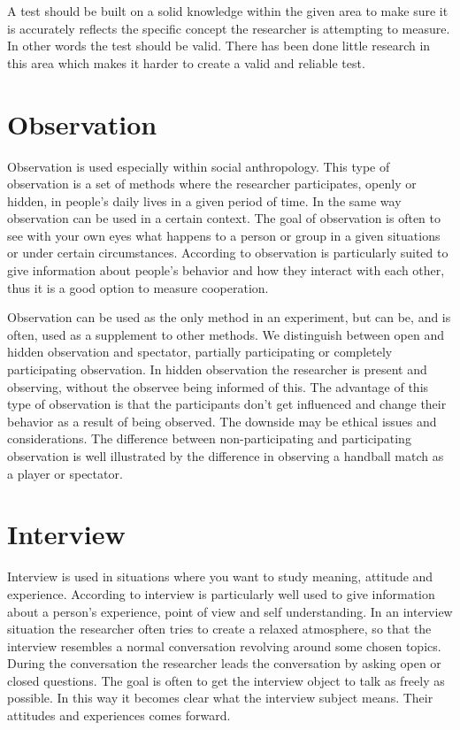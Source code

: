 \bigskip\noindent
A test should be built on a solid knowledge within the given area to make sure it is accurately reflects the specific concept the researcher is attempting to measure. In other words the test should be valid. There has been done little research in this area which makes it harder to create a valid and reliable test.

\section{Observation}
Observation is used especially within social anthropology. This type of observation is a set of methods where the researcher participates, openly or hidden, in people's daily lives in a given period of time\cite{tjora2012kvalitative}. In the same way observation can be used in a certain context. The goal of observation is often to see with your own eyes what happens to a person or group in a given situations or under certain circumstances. According to  observation is particularly suited to give information about people's behavior and how they interact with each other, thus it is a good option to measure cooperation. 

\bigskip\noindent
Observation can be used as the only method in an experiment, but can be, and is often, used as a supplement to other methods. We distinguish between open and hidden observation and spectator, partially participating or completely participating observation. In hidden observation the researcher is present and observing, without the observee being informed of this. The advantage of this type of observation is that the participants don't get influenced and change their behavior as a result of being observed. The downside may be ethical issues and considerations. The difference between non-participating and participating observation is well illustrated by the difference in observing a handball match as a player or spectator. 

\section{Interview}
Interview is used in situations where you want to study meaning, attitude and experience\cite{tjora2012kvalitative}. According to  interview is particularly well used to give information about a person's experience, point of view and self understanding. In an interview situation the researcher often tries to create a relaxed atmosphere, so that the interview resembles a normal conversation revolving around some chosen topics. During the conversation the researcher leads the conversation by asking open or closed questions. The goal is often to get the interview object to talk as freely as possible. In this way it becomes clear what the interview subject means. Their attitudes and experiences comes forward. 

